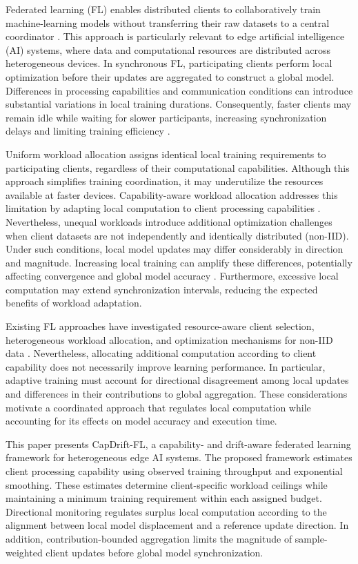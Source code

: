 \documentclass[conference]{IEEEtran}
\begin{document}
Federated learning (FL) enables distributed clients to collaboratively train machine-learning models without transferring their raw datasets to a central coordinator \cite{mcmahan2017}. This approach is particularly relevant to edge artificial intelligence (AI) systems, where data and computational resources are distributed across heterogeneous devices. In synchronous FL, participating clients perform local optimization before their updates are aggregated to construct a global model. Differences in processing capabilities and communication conditions can introduce substantial variations in local training durations. Consequently, faster clients may remain idle while waiting for slower participants, increasing synchronization delays and limiting training efficiency \cite{chai2020tifl,lai2021oort}.

Uniform workload allocation assigns identical local training requirements to participating clients, regardless of their computational capabilities. Although this approach simplifies training coordination, it may underutilize the resources available at faster devices. Capability-aware workload allocation addresses this limitation by adapting local computation to client processing capabilities \cite{li2024fedcompass,narmadha2025fedeff}. Nevertheless, unequal workloads introduce additional optimization challenges when client datasets are not independently and identically distributed (non-IID). Under such conditions, local model updates may differ considerably in direction and magnitude. Increasing local training can amplify these differences, potentially affecting convergence and global model accuracy \cite{li2020fedprox,karimireddy2020scaffold}. Furthermore, excessive local computation may extend synchronization intervals, reducing the expected benefits of workload adaptation.

Existing FL approaches have investigated resource-aware client selection, heterogeneous workload allocation, and optimization mechanisms for non-IID data \cite{lai2021oort,shin2022fedbalancer,wang2020fednova}. Nevertheless, allocating additional computation according to client capability does not necessarily improve learning performance. In particular, adaptive training must account for directional disagreement among local updates and differences in their contributions to global aggregation. These considerations motivate a coordinated approach that regulates local computation while accounting for its effects on model accuracy and execution time.

This paper presents CapDrift-FL, a capability- and drift-aware federated learning framework for heterogeneous edge AI systems. The proposed framework estimates client processing capability using observed training throughput and exponential smoothing. These estimates determine client-specific workload ceilings while maintaining a minimum training requirement within each assigned budget. Directional monitoring regulates surplus local computation according to the alignment between local model displacement and a reference update direction. In addition, contribution-bounded aggregation limits the magnitude of sample-weighted client updates before global model synchronization.
\end{document}
